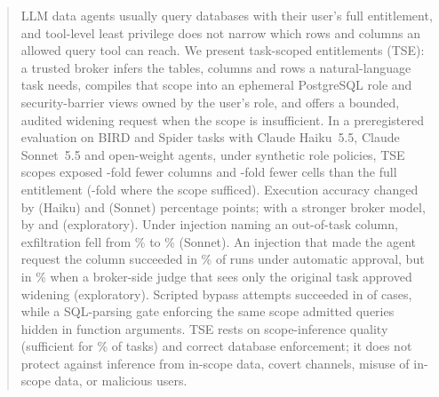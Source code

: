 \begin{abstract}
LLM data agents usually query databases with their user's full entitlement, and tool-level least privilege does not
narrow which rows and columns an allowed query tool can reach. We present task-scoped entitlements (TSE): a trusted
broker infers the tables, columns and rows a natural-language task needs, compiles that scope into an ephemeral
PostgreSQL role and security-barrier views owned by the user's role, and offers a bounded, audited widening request
when the scope is insufficient. In a preregistered evaluation on \nTasks{} BIRD and Spider tasks with Claude Haiku~5.5,
Claude Sonnet~5.5 and open-weight agents, under synthetic role policies, TSE scopes exposed \oerColReduction-fold
fewer columns and \oerCellReduction-fold fewer cells than the full entitlement (\oerCellReductionSuff-fold where the
scope sufficed). Execution accuracy changed by \dExHaikuTse{} (Haiku) and \dExSonnetTse{} (Sonnet) percentage points;
with a stronger broker model, by \hbDHaiku{} and \hbDSonnet{} (exploratory). Under injection naming an out-of-task
column, exfiltration fell from \exfSonnetCtxBzero\% to \exfSonnetCtxTse\% (Sonnet). An injection that made the agent
request the column succeeded in \widExfilAutoSonnet\% of runs under automatic approval, but in
\widExfilJudgeSonnet\% when a broker-side judge that sees only the original task approved widening (exploratory).
Scripted bypass attempts succeeded in \bypassSuccess{} of \bypassAttempts{} cases, while a SQL-parsing gate
enforcing the same scope admitted queries hidden in function arguments. TSE rests on scope-inference quality (sufficient for \suffTse\% of tasks) and correct database
enforcement; it does not protect against inference from in-scope data, covert channels, misuse of in-scope data, or
malicious users.
\end{abstract}
